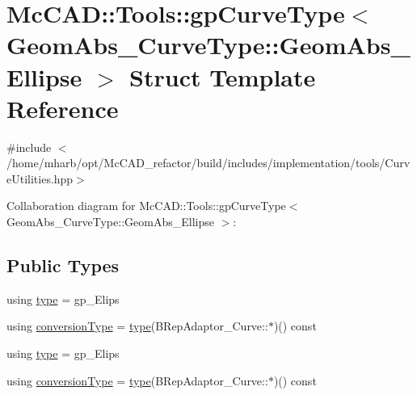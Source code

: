 \hypertarget{structMcCAD_1_1Tools_1_1gpCurveType_3_01GeomAbs__CurveType_1_1GeomAbs__Ellipse_01_4}{}\section{Mc\+C\+AD\+:\+:Tools\+:\+:gp\+Curve\+Type$<$ Geom\+Abs\+\_\+\+Curve\+Type\+:\+:Geom\+Abs\+\_\+\+Ellipse $>$ Struct Template Reference}
\label{structMcCAD_1_1Tools_1_1gpCurveType_3_01GeomAbs__CurveType_1_1GeomAbs__Ellipse_01_4}


{\ttfamily \#include $<$/home/mharb/opt/\+Mc\+C\+A\+D\+\_\+refactor/build/includes/implementation/tools/\+Curve\+Utilities.\+hpp$>$}



Collaboration diagram for Mc\+C\+AD\+:\+:Tools\+:\+:gp\+Curve\+Type$<$ Geom\+Abs\+\_\+\+Curve\+Type\+:\+:Geom\+Abs\+\_\+\+Ellipse $>$\+:
\subsection*{Public Types}
\begin{DoxyCompactItemize}
\item 
using \hyperlink{structMcCAD_1_1Tools_1_1gpCurveType_3_01GeomAbs__CurveType_1_1GeomAbs__Ellipse_01_4_a5a6977fe73eccc98c1ba004cd9a751cb}{type} = gp\+\_\+\+Elips
\item 
using \hyperlink{structMcCAD_1_1Tools_1_1gpCurveType_3_01GeomAbs__CurveType_1_1GeomAbs__Ellipse_01_4_a0a0d12fadf9056491f9ea92a4f59b293}{conversion\+Type} = \hyperlink{structMcCAD_1_1Tools_1_1gpCurveType_3_01GeomAbs__CurveType_1_1GeomAbs__Ellipse_01_4_a5a6977fe73eccc98c1ba004cd9a751cb}{type}(B\+Rep\+Adaptor\+\_\+\+Curve\+::$\ast$)() const
\item 
using \hyperlink{structMcCAD_1_1Tools_1_1gpCurveType_3_01GeomAbs__CurveType_1_1GeomAbs__Ellipse_01_4_a5a6977fe73eccc98c1ba004cd9a751cb}{type} = gp\+\_\+\+Elips
\item 
using \hyperlink{structMcCAD_1_1Tools_1_1gpCurveType_3_01GeomAbs__CurveType_1_1GeomAbs__Ellipse_01_4_a0a0d12fadf9056491f9ea92a4f59b293}{conversion\+Type} = \hyperlink{structMcCAD_1_1Tools_1_1gpCurveType_3_01GeomAbs__CurveType_1_1GeomAbs__Ellipse_01_4_a5a6977fe73eccc98c1ba004cd9a751cb}{type}(B\+Rep\+Adaptor\+\_\+\+Curve\+::$\ast$)() const
\end{DoxyCompactItemize}
